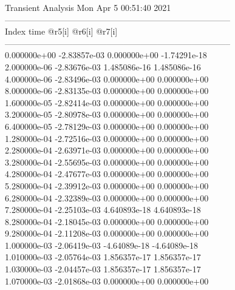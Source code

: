                                    Transient Analysis  Mon Apr  5 00:51:40  2021\\ \hline
--------------------------------------------------------------------------------\\ \hline
Index   time            @r5[i]          @r6[i]          @r7[i]          \\ \hline
--------------------------------------------------------------------------------\\ 	0.000000e+00	-2.83857e-03	0.000000e+00	-1.74291e-18	\\ 	2.000000e-06	-2.83676e-03	1.485086e-16	1.485086e-16	\\ 	4.000000e-06	-2.83496e-03	0.000000e+00	0.000000e+00	\\ 	8.000000e-06	-2.83135e-03	0.000000e+00	0.000000e+00	\\ 	1.600000e-05	-2.82414e-03	0.000000e+00	0.000000e+00	\\ 	3.200000e-05	-2.80978e-03	0.000000e+00	0.000000e+00	\\ 	6.400000e-05	-2.78129e-03	0.000000e+00	0.000000e+00	\\ 	1.280000e-04	-2.72516e-03	0.000000e+00	0.000000e+00	\\ 	2.280000e-04	-2.63971e-03	0.000000e+00	0.000000e+00	\\ 	3.280000e-04	-2.55695e-03	0.000000e+00	0.000000e+00	\\ 	4.280000e-04	-2.47677e-03	0.000000e+00	0.000000e+00	\\ 	5.280000e-04	-2.39912e-03	0.000000e+00	0.000000e+00	\\ 	6.280000e-04	-2.32389e-03	0.000000e+00	0.000000e+00	\\ 	7.280000e-04	-2.25103e-03	4.640893e-18	4.640893e-18	\\ 	8.280000e-04	-2.18045e-03	0.000000e+00	0.000000e+00	\\ 	9.280000e-04	-2.11208e-03	0.000000e+00	0.000000e+00	\\ 	1.000000e-03	-2.06419e-03	-4.64089e-18	-4.64089e-18	\\ 	1.010000e-03	-2.05764e-03	1.856357e-17	1.856357e-17	\\ 	1.030000e-03	-2.04457e-03	1.856357e-17	1.856357e-17	\\ 	1.070000e-03	-2.01868e-03	0.000000e+00	0.000000e+00	\\ \hline
